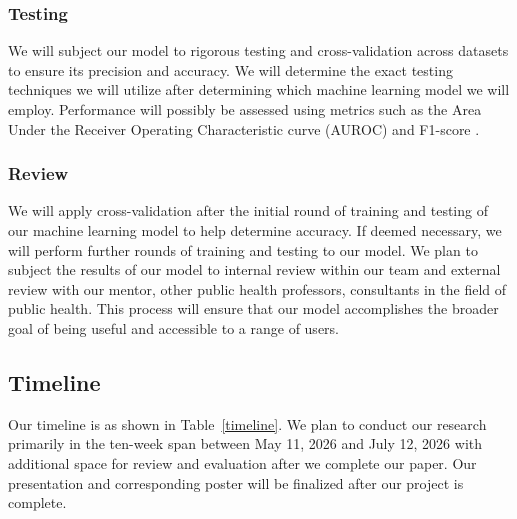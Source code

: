 \documentclass[journal]{IEEEtran}
\begin{document}
	\subsubsection{Testing}

	We will subject our model to rigorous testing and cross-validation across datasets to ensure its precision and accuracy. We will determine the exact testing techniques we will utilize after determining which machine learning model we will employ. Performance will possibly be assessed using metrics such as the Area Under the Receiver Operating Characteristic curve (AUROC) and F1-score \cite{taiUtilizingMachineLearning2025, partonMachineLearningApproach2026}.

	\subsubsection{Review}

	We will apply cross-validation after the initial round of training and testing of our machine learning model to help determine accuracy. If deemed necessary, we will perform further rounds of training and testing to our model. We plan to subject the results of our model to internal review within our team and external review with our mentor, other public health professors, consultants in the field of public health. This process will ensure that our model accomplishes the broader goal of being useful and accessible to a range of users.

	\subsection{Timeline}

	Our timeline is as shown in Table~\ref{timeline}. We plan to conduct our research primarily in the ten-week span between May 11, 2026 and July 12, 2026 with additional space for review and evaluation after we complete our paper. Our presentation and corresponding poster will be finalized after our project is complete.

	\renewcommand{\arraystretch}{1.3}
\end{document}
